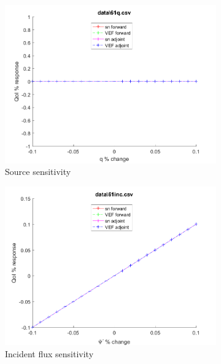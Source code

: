 \documentclass{article}
\begin{document}
\begin{figure}[H]
\label{Case61Sens}
\centering
\begin{subfigure}{.5\textwidth}
  \centering
  \includegraphics[width=.98\linewidth]{IanProposal/figures2/61qSens.png}
  \caption{Source sensitivity}
  \label{fig:sfig1}
\end{subfigure}%
\begin{subfigure}{.5\textwidth}
  \centering
  \includegraphics[width=.98\linewidth]{IanProposal/figures2/61incSens.png}
  \caption{Incident flux sensitivity}
  \label{fig:sfig4}
\end{subfigure}%
\\
\begin{subfigure}{.5\textwidth}
  \centering

\end{subfigure}
\end{figure}
\end{document}
